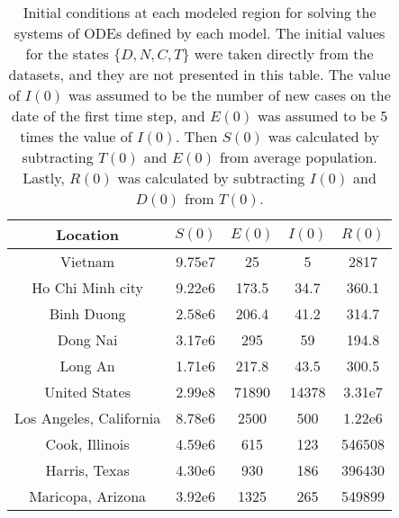 \begin{table}[h]
    \centering
    \begin{tabular}{| c | c | c | c | c |}
        Location & $S(0)$ & $E(0)$ & $I(0)$ & $R(0)$ \\
        \hline\hline
        Vietnam & 9.75e7 & 25 & 5 & 2817 \\
        \hline
        Ho Chi Minh city & 9.22e6 & 173.5 & 34.7 & 360.1 \\
        \hline
        Binh Duong & 2.58e6 & 206.4 & 41.2 & 314.7 \\
        \hline
        Dong Nai & 3.17e6 & 295 & 59 & 194.8 \\
        \hline
        Long An & 1.71e6 & 217.8 & 43.5 & 300.5 \\
        \hline
        United States & 2.99e8 & 71890 & 14378 & 3.31e7 \\
        \hline
        Los Angeles, California & 8.78e6 & 2500 & 500 & 1.22e6 \\
        \hline
        Cook, Illinois & 4.59e6 & 615 & 123 & 546508 \\
        \hline
        Harris, Texas & 4.30e6 & 930 & 186 & 396430 \\
        \hline
        Maricopa, Arizona & 3.92e6 & 1325 & 265 & 549899 \\
        \hline
    \end{tabular}
    \caption[Experiment initial conditions]{Initial conditions at each modeled region for solving the systems of ODEs defined by each model. The initial values for the states $\{D, N, C, T\}$ were taken directly from the datasets, and they are not presented in this table. The value of $I(0)$ was assumed to be the number of new cases on the date of the first time step, and $E(0)$ was assumed to be 5 times the value of $I(0)$. Then $S(0)$ was calculated by subtracting $T(0)$ and $E(0)$ from average population. Lastly, $R(0)$ was calculated by subtracting $I(0)$ and $D(0)$ from $T(0)$.}
    \label{tab:ude-model-initial-conditions}
\end{table}

